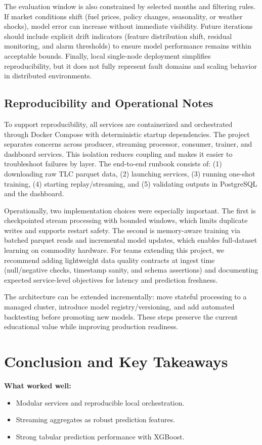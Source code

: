 \documentclass[11pt]{article}
\begin{document}
The evaluation window is also constrained by selected months and filtering rules. If market conditions shift (fuel prices, policy changes, seasonality, or weather shocks), model error can increase without immediate visibility. Future iterations should include explicit drift indicators (feature distribution shift, residual monitoring, and alarm thresholds) to ensure model performance remains within acceptable bounds. Finally, local single-node deployment simplifies reproducibility, but it does not fully represent fault domains and scaling behavior in distributed environments.

\subsection{Reproducibility and Operational Notes}
To support reproducibility, all services are containerized and orchestrated through Docker Compose with deterministic startup dependencies. The project separates concerns across producer, streaming processor, consumer, trainer, and dashboard services. This isolation reduces coupling and makes it easier to troubleshoot failures by layer. The end-to-end runbook consists of: (1) downloading raw TLC parquet data, (2) launching services, (3) running one-shot training, (4) starting replay/streaming, and (5) validating outputs in PostgreSQL and the dashboard.

Operationally, two implementation choices were especially important. The first is checkpointed stream processing with bounded windows, which limits duplicate writes and supports restart safety. The second is memory-aware training via batched parquet reads and incremental model updates, which enables full-dataset learning on commodity hardware. For teams extending this project, we recommend adding lightweight data quality contracts at ingest time (null/negative checks, timestamp sanity, and schema assertions) and documenting expected service-level objectives for latency and prediction freshness.

The architecture can be extended incrementally: move stateful processing to a managed cluster, introduce model registry/versioning, and add automated backtesting before promoting new models. These steps preserve the current educational value while improving production readiness.

\section{Conclusion and Key Takeaways}
\textbf{What worked well:}
\begin{itemize}[leftmargin=1.5em]
    \item Modular services and reproducible local orchestration.
    \item Streaming aggregates as robust prediction features.
    \item Strong tabular prediction performance with XGBoost.
\end{itemize}
\end{document}
